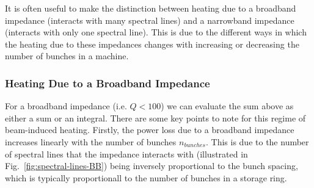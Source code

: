 It is often useful to make the distinction between heating due to a broadband impedance (interacts with many spectral lines) and a narrowband impedance (interacts with only one spectral line). This is due to the different ways in which the heating due to these impedances changes with increasing or decreasing the number of bunches in a machine.

\subsubsection{Heating Due to a Broadband Impedance}

For a broadband impedance (i.e. $Q < 100$) we can evaluate the sum above as either a sum or an integral. There are some key points to note for this regime of beam-induced heating. Firstly, the power loss due to a broadband impedance increases linearly with the number of bunches $n_{bunches}$. This is due to the number of spectral lines that the impedance interacts with (illustrated in Fig.~\ref{fig:spectral-lines-BB}) being inversely proportional to the bunch spacing, which is typically proportionall to the number of bunches in a storage ring.


